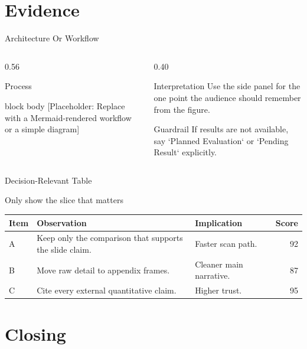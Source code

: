 \documentclass[12pt,aspectratio=169,xcolor={table}]{beamer}
\newcommand{\placeholder}[2]{%
  \begin{beamercolorbox}[wd=\linewidth,rounded=true,sep=0.7em]{block body}
    \centering
    \vspace*{#1}
    {\color{ThemeTextMuted}[Placeholder: #2]}
    \vspace*{#1}
  \end{beamercolorbox}
}
\begin{document}
\section{Evidence}

\begin{frame}{Architecture Or Workflow}
  \begin{columns}[T,totalwidth=\textwidth]
    \begin{column}{0.56\textwidth}
      \begin{block}{Process}
        \placeholder{2.0cm}{Replace with a Mermaid-rendered workflow or a simple diagram}
      \end{block}
    \end{column}
    \begin{column}{0.40\textwidth}
      \begin{highlightbox}{Interpretation}
        Use the side panel for the one point the audience should remember from the figure.
      \end{highlightbox}
      \vspace{0.4cm}
      \begin{block}{Guardrail}
        If results are not available, say `Planned Evaluation` or `Pending Result` explicitly.
      \end{block}
    \end{column}
  \end{columns}
\end{frame}

\begin{frame}{Decision-Relevant Table}
  \begin{block}{Only show the slice that matters}
    \small
    \begin{tabularx}{\textwidth}{lXXr}
      \toprule
      Item & Observation & Implication & Score \\
      \midrule
      A & Keep only the comparison that supports the slide claim. & Faster scan path. & 92 \\
      B & Move raw detail to appendix frames. & Cleaner main narrative. & 87 \\
      C & Cite every external quantitative claim. & Higher trust. & 95 \\
      \bottomrule
    \end{tabularx}
  \end{block}
\end{frame}

\section{Closing}
\end{document}

